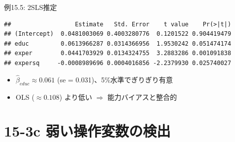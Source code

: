 \documentclass[
  ignorenonframetext,
]{beamer}
\newenvironment{Shaded}{\begin{snugshade}}{\end{snugshade}}
\newcommand{\AttributeTok}[1]{\textcolor[rgb]{0.13,0.29,0.53}{#1}}
\newcommand{\DecValTok}[1]{\textcolor[rgb]{0.00,0.00,0.81}{#1}}
\newcommand{\FunctionTok}[1]{\textcolor[rgb]{0.13,0.29,0.53}{\textbf{#1}}}
\newcommand{\NormalTok}[1]{#1}
\newcommand{\OtherTok}[1]{\textcolor[rgb]{0.56,0.35,0.01}{#1}}
\newcommand{\SpecialCharTok}[1]{\textcolor[rgb]{0.81,0.36,0.00}{\textbf{#1}}}
\providecommand{\tightlist}{%
  \setlength{\itemsep}{0pt}\setlength{\parskip}{0pt}}
\begin{document}
\begin{frame}[fragile]{例15.5: 2SLS推定}
\label{ux4f8b15.5-2slsux63a8ux5b9a}
\footnotesize

\begin{Shaded}
\end{Shaded}

\begin{verbatim}
##                  Estimate   Std. Error    t value    Pr(>|t|)
## (Intercept)  0.0481003069 0.4003280776  0.1201522 0.904419479
## educ         0.0613966287 0.0314366956  1.9530242 0.051474174
## exper        0.0441703929 0.0134324755  3.2883286 0.001091838
## expersq     -0.0008989696 0.0004016856 -2.2379930 0.025740027
\end{verbatim}

\normalsize

\begin{itemize}
\tightlist
\item
  \(\hat{\beta}_{educ} \approx 0.061\) (se =
  0.031)、5\%水準でぎりぎり有意
\item
  OLS (\(\approx 0.108\)) より低い \(\Rightarrow\) 能力バイアスと整合的
\end{itemize}
\end{frame}

\section{15-3c
弱い操作変数の検出}\label{c-ux5f31ux3044ux64cdux4f5cux5909ux6570ux306eux691cux51fa}
\end{document}
